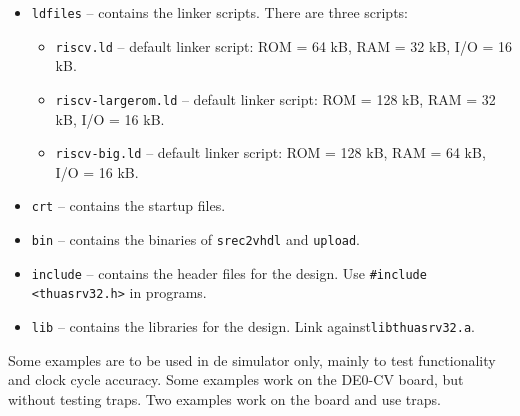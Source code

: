 \documentclass[12pt]{article}
\begin{document}
\begin{itemize}
\item \lstinline|ldfiles| -- contains the linker scripts. There are three scripts:
\begin{itemize}
\item \lstinline|riscv.ld| -- default linker script: ROM = 64 kB, RAM = 32 kB, I/O = 16 kB.
\item \lstinline|riscv-largerom.ld| -- default linker script: ROM = 128 kB, RAM = 32 kB, I/O = 16 kB.
\item \lstinline|riscv-big.ld| -- default linker script: ROM = 128 kB, RAM = 64 kB, I/O = 16 kB.
\end{itemize}
\item \lstinline|crt| -- contains the startup files.
\item \lstinline|bin| -- contains the binaries of \lstinline|srec2vhdl| and \lstinline|upload|.
\item \lstinline|include| -- contains the header files for the design. Use \lstinline|#include <thuasrv32.h>| in programs.
\item \lstinline|lib| -- contains the libraries for the design. Link against\lstinline|libthuasrv32.a|.
\end{itemize}

Some examples are to be used in de simulator only, mainly to test functionality and clock cycle accuracy. Some examples work on the DE0-CV board, but without testing traps. Two examples work on the board and use traps.
\end{document}
